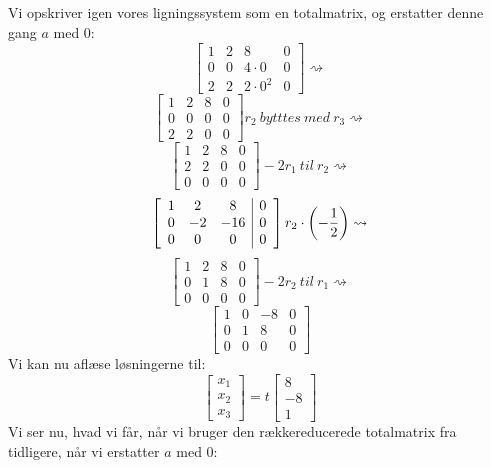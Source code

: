 \documentclass[a4paper,12pt]{article}
\begin{document}
\subsection{}
Vi opskriver igen vores ligningssystem som en totalmatrix, og erstatter denne gang $a$ med 0:
\[
\left[\begin{array}{ccc|c}
    1 & 2 & 8 & 0 \\
    0 & 0 & 4\cdot0 & 0 \\
    2 & 2 & 2\cdot0^2 & 0
\end{array}\right]
\rightsquigarrow
\]
\[
\left[\begin{array}{ccc|c}
    1 & 2 & 8 & 0 \\
    0 & 0 & 0 & 0 \\
    2 & 2 & 0 & 0
\end{array}\right]
r_2 \ bytttes \ med \ r_3
\rightsquigarrow
\]
\[
\left[\begin{array}{ccc|c}
    1 & 2 & 8 & 0 \\
    2 & 2 & 0 & 0 \\
    0 & 0 & 0 & 0
\end{array}\right]
-2r_1 \ til \ r_2
\rightsquigarrow
\]
\[
\left[\begin{array}{ccc|c}
    1 & 2 & 8 & 0 \\
    0 & -2 & -16 & 0 \\
    0 & 0 & 0 & 0
\end{array}\right]
r_2 \cdot \left( -\dfrac{1}{2}\right)
\rightsquigarrow
\]
\[
\left[\begin{array}{ccc|c}
    1 & 2 & 8 & 0 \\
    0 & 1 & 8 & 0 \\
    0 & 0 & 0 & 0
\end{array}\right]
-2r_2 \ til \ r_1
\rightsquigarrow
\]
\[
\left[\begin{array}{ccc|c}
    1 & 0 & -8 & 0 \\
    0 & 1 & 8 & 0 \\
    0 & 0 & 0 & 0
\end{array}\right]
\]
Vi kan nu aflæse løsningerne til:
\[
\left[\begin{array}{c}
    x_1 \\
    x_2 \\
    x_3
\end{array}\right]
=
t
\left[\begin{array}{c}
    8 \\
    -8 \\
    1
\end{array}\right]
\]
Vi ser nu, hvad vi får, når vi bruger den rækkereducerede totalmatrix fra tidligere, når vi erstatter $a$ med 0:
\end{document}
